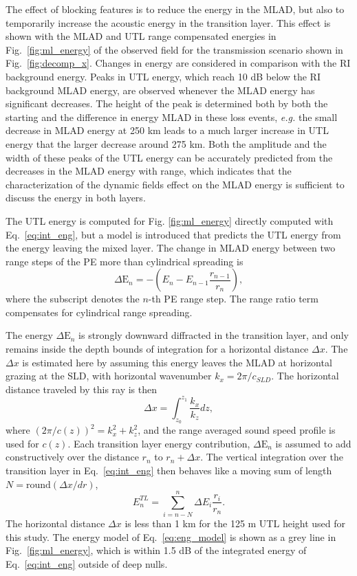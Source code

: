 \documentclass[preprint,NumberedRefs]{JASA}
\begin{document}
The effect of blocking features is to reduce the energy in the MLAD, but also to temporarily increase the acoustic energy in the transition layer. This effect is shown with the MLAD and UTL range compensated energies in Fig.~\ref{fig:ml_energy} of the observed field for the transmission scenario shown in Fig.~\ref{fig:decomp_x}. Changes in energy are considered in comparison with the RI background energy. Peaks in UTL energy, which reach 10 dB below the RI background MLAD energy, are observed whenever the MLAD energy has significant decreases. The height of the peak is determined both by both the starting and the difference in energy MLAD in these loss events, \emph{e.g.} the small decrease in MLAD energy at 250 km leads to a much larger increase in UTL energy that the larger decrease around 275 km. Both the amplitude and the width of these peaks of the UTL energy can be accurately predicted from the decreases in the MLAD energy with range, which indicates that the characterization of the dynamic fields effect on the MLAD energy is sufficient to discuss the energy in both layers.

The UTL energy is computed for Fig. \ref{fig:ml_energy} directly computed with Eq.~\eqref{eq:int_eng}, but a model is introduced that predicts the UTL energy from the energy leaving the mixed layer. The change in MLAD energy between two range steps of the PE more than cylindrical spreading is
\begin{equation}
    \Delta \textrm{E}_n = -\left(E_n - E_{n-1} \frac{r_{n-1}}{r_n}\right),
\end{equation}
where the subscript denotes the $n$-th PE range step. The range ratio term compensates for cylindrical range spreading.

The energy $\Delta \textrm{E}_n$ is strongly downward diffracted in the transition layer, and only remains inside the depth bounds of integration for a horizontal distance $\Delta x$. The $\Delta x$ is estimated here by assuming this energy leaves the MLAD at horizontal grazing at the SLD, with horizontal wavenumber $k_x = 2 \pi / c_{SLD}$. The horizontal distance traveled by this ray is then
\begin{equation}
    \Delta x = \int_{z_0}^{z_1} \frac{k_x}{k_z} dz,
\end{equation}
where $(2 \pi / c(z))^2 = k_x^2 + k_z^2$, and the range averaged sound speed profile is used for $c(z)$. Each transition layer energy contribution, $\Delta \textrm{E}_n$ is assumed to add constructively over the distance $r_n$ to $r_n + \Delta x$. The vertical integration over the transition layer in Eq.~\eqref{eq:int_eng} then behaves like a moving sum of length $N=\textrm{round}(\Delta x / dr)$,
\begin{equation}
    E^{TL}_n = \sum_{i=n-N}^{n} \Delta E_i \frac{r_i}{r_n}.
    \label{eq:eng_model}
\end{equation}
The horizontal distance $\Delta x$ is less than 1 km for the 125 m UTL height used for this study. The energy model of Eq.~\eqref{eq:eng_model} is shown as a grey line in Fig.~\ref{fig:ml_energy}, which is within 1.5 dB of the integrated energy of Eq.~\eqref{eq:int_eng} outside of deep nulls.
\end{document}
